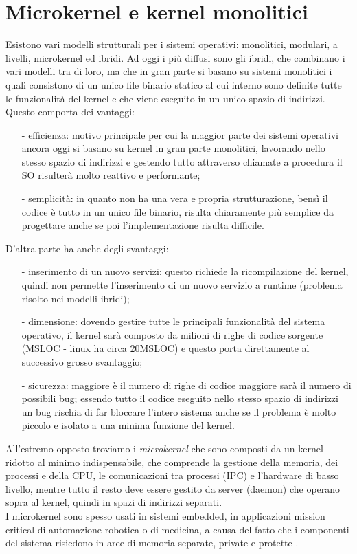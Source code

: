 \section{Microkernel e kernel monolitici}
Esistono vari modelli strutturali per i sistemi operativi: monolitici, modulari, a livelli, microkernel ed ibridi. Ad oggi i più diffusi sono gli ibridi, che combinano i vari modelli tra di loro, ma che in gran parte si basano su sistemi monolitici i quali consistono di un unico file binario statico al cui interno sono definite tutte le funzionalità del kernel e che viene eseguito in un unico spazio di indirizzi. Questo comporta dei vantaggi: 
\begin{itemize}
	\item[-] efficienza:  motivo principale per cui la maggior parte dei sistemi operativi ancora oggi si basano su kernel in gran parte monolitici, lavorando nello stesso spazio di indirizzi e gestendo tutto attraverso chiamate a procedura il SO risulterà molto reattivo e performante;
	\item[-] semplicità: in quanto non ha una vera e  propria strutturazione, bensì il codice è tutto in un unico file binario, risulta chiaramente più semplice da progettare anche se poi l'implementazione risulta difficile.
\end{itemize} 
D'altra parte ha anche degli svantaggi: 
\begin{itemize}
	\item[-] inserimento di un nuovo servizi: questo richiede la ricompilazione del kernel, quindi non permette l'inserimento di un nuovo servizio a runtime (problema risolto nei modelli ibridi);
	\item[-] dimensione: dovendo gestire tutte le principali funzionalità del sistema operativo, il kernel sarà composto da milioni di righe di codice sorgente (MSLOC - linux ha circa 20MSLOC) e questo porta direttamente al successivo grosso svantaggio;
	\item[-] sicurezza: maggiore è il numero di righe di codice maggiore sarà il numero di possibili bug; essendo tutto il codice eseguito nello stesso spazio di indirizzi un bug rischia di far bloccare l'intero sistema anche se il problema è molto piccolo e isolato a una minima funzione del kernel.
\end{itemize}
All'estremo opposto troviamo i \textit{microkernel} che sono composti da un kernel ridotto al minimo indispensabile, che comprende la gestione della memoria, dei processi e della CPU, le comunicazioni tra processi (IPC) e l'hardware di basso livello, mentre tutto il resto deve essere gestito da server (daemon) che operano sopra al kernel, quindi in spazi di indirizzi separati.\\ I microkernel sono spesso usati in sistemi embedded, in applicazioni mission critical di automazione robotica o di medicina, a causa del fatto che i componenti del sistema risiedono in aree di memoria separate, private e protette \cite{kernelWikipedia}.\\
